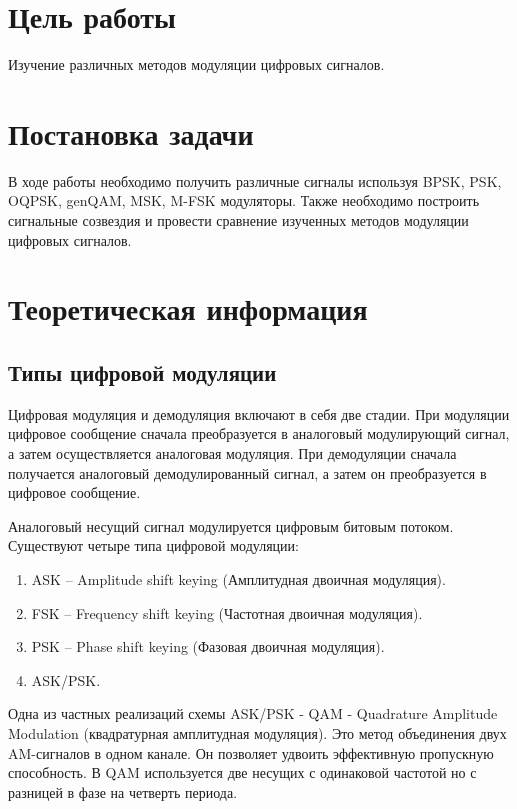 

\setcounter{tocdepth}{3}






 
\section{Цель работы}
Изучение различных методов модуляции цифровых сигналов.
 
\section{Постановка задачи}
В ходе работы необходимо получить различные сигналы используя BPSK, PSK, OQPSK, genQAM, MSK, M-FSK модуляторы.
Также необходимо построить сигнальные созвездия и провести сравнение изученных методов модуляции цифровых сигналов.

\section{Теоретическая информация}

\subsection{Типы цифровой модуляции}

Цифровая модуляция и демодуляция включают в себя две стадии. При модуляции цифровое сообщение сначала преобразуется в аналоговый модулирующий сигнал, а затем осуществляется аналоговая модуляция. При демодуляции сначала получается аналоговый демодулированный сигнал, а затем он преобразуется в цифровое сообщение.
 
Аналоговый несущий сигнал модулируется цифровым битовым потоком.
Существуют четыре типа цифровой модуляции:
\begin{enumerate}
\item ASK – Amplitude shift keying (Амплитудная двоичная модуляция).
\item FSK – Frequency shift keying (Частотная двоичная модуляция).
\item PSK – Phase shift keying (Фазовая двоичная модуляция).
\item ASK/PSK.
\end{enumerate}
Одна из частных реализаций схемы ASK/PSK - QAM - Quadrature Amplitude Modulation (квадратурная амплитудная модуляция).
Это метод объединения двух AM-сигналов в одном канале. Он позволяет удвоить эффективную пропускную способность.
В QAM используется две несущих с одинаковой частотой но с разницей в фазе на четверть периода.

